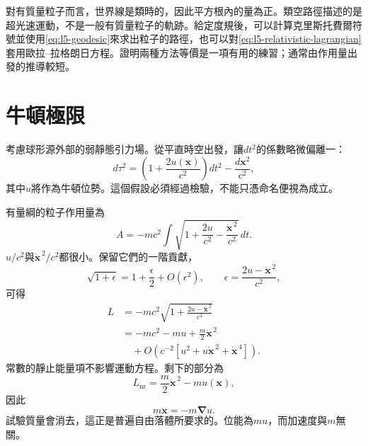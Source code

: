 \begin{classroomqa}
\end{classroomqa}

對有質量粒子而言，世界線是類時的，因此平方根內的量為正。類空路徑描述的是超光速運動，不是一般有質量粒子的軌跡。給定度規後，可以計算克里斯托費爾符號並使用\eqref{eq:l5-geodesic}來求出粒子的路徑，也可以對\eqref{eq:l5-relativistic-lagrangian}套用歐拉--拉格朗日方程。證明兩種方法等價是一項有用的練習；通常由作用量出發的推導較短。

\section{牛頓極限}

考慮球形源外部的弱靜態引力場。從平直時空出發，讓\(dt^2\)的係數略微偏離一：
\begin{equation}
d\tau^2
=\left(1+\frac{2u(\mathbf{x})}{c^2}\right)dt^2
-\frac{d\mathbf{x}^2}{c^2},
\label{eq:l5-weak-metric}
\end{equation}
其中\(u\)將作為牛頓位勢。這個假設必須經過檢驗，不能只憑命名便視為成立。

有量綱的粒子作用量為
\begin{equation}
A=-mc^2\int
\sqrt{1+\frac{2u}{c^2}
-\frac{\dot{\mathbf{x}}^{\,2}}{c^2}}\,dt.
\label{eq:l5-weak-action}
\end{equation}
\(u/c^2\)與\(\dot{\mathbf{x}}^{\,2}/c^2\)都很小。保留它們的一階貢獻，
\begin{equation}
\sqrt{1+\epsilon}
=1+\frac{\epsilon}{2}+O(\epsilon^2),
\qquad
\epsilon=\frac{2u-\dot{\mathbf{x}}^{\,2}}{c^2},
\end{equation}
可得
\begin{align}
L
&=-mc^2
\sqrt{1+\frac{2u-\dot{\mathbf{x}}^{\,2}}{c^2}}\\
&=-mc^2-mu+\frac{m}{2}\dot{\mathbf{x}}^{\,2}\\
&\quad+O\!\left(c^{-2}
 [u^2+u\dot{\mathbf{x}}^{\,2}+\dot{\mathbf{x}}^{\,4}]\right).
\label{eq:l5-newton-expansion}
\end{align}
常數的靜止能量項不影響運動方程。剩下的部分為
\begin{equation}
L_{\mathrm{nr}}
=\frac{m}{2}\dot{\mathbf{x}}^{\,2}-m u(\mathbf{x}),
\label{eq:l5-newton-lagrangian}
\end{equation}
因此
\begin{equation}
m\ddot{\mathbf{x}}=-m\boldsymbol{\nabla}u.
\label{eq:l5-newton-equation}
\end{equation}
試驗質量會消去，這正是普遍自由落體所要求的。位能為\(m u\)，而加速度與\(m\)無關。

